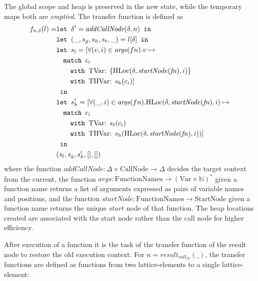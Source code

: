 The global scope and heap is preserved in the new state, while the temporary maps both are \emph{emptied}. The transfer function is defined as
\begin{align}
      f_{n,\delta}(l) =     &\texttt{let } \delta' = \mathit{addCallNode}(\delta, n) \texttt{ in }\notag\\
                            &\texttt{let } (\_, s_g, s_h,s_t, \_) = l[\delta] \texttt{ in }\notag\\
                            &\texttt{let } s_l = [\forall (v, i) \in \mathit{args}(fn). v \mapsto \notag\\
                            &\quad\texttt{match }c_i\notag\\
                            &\quad\quad\texttt{with }\text{TVar}\text{: } \{\text{HLoc}(\delta, \mathit{startNode}(\mathit{fn}), i)\}\notag\\
                            &\quad\quad\texttt{with }\text{THVar}\text{: } s_h(c_i)]\notag\\
                            & \texttt{ in }\notag\\
                            &\texttt{let } s_h' = [\forall (\_, i) \in \mathit{args}(fn). \text{HLoc}(\delta, \mathit{startNode}(\mathit{fn}), i) \mapsto \notag\\
                            &\quad\texttt{match }c_i\notag\\
                            &\quad\quad\texttt{with }\text{TVar}\text{: } s_t(c_i)\notag\\
                            &\quad\quad\texttt{with }\text{THVar}\text{: } s_h(\text{HLoc}(\delta, \mathit{startNode}(\mathit{fn}), i))]\notag\\
                            & \texttt{ in }\notag\\
                            &(s_l, s_g, s_h',[], [])
\end{align}
where the function $\mathit{addCallNode} : \Delta \times \text{CallNode} \rightarrow \Delta$ decides the target context from the current, the function $\mathit{args} : \text{FunctionNames} \rightarrow (\text{Var} \times \mathbb{N})^*$ given a function name returns a list of arguments expressed as pairs of variable names and positions, and the function $\mathit{startNode} : \text{FunctionNames} \rightarrow \text{StartNode}$ given a function name returns the unique $\mathit{start}$ node of that function. The heap locations created are associated with the start node rather than the call node for higher efficiency.

After execution of a function it is the task of the transfer function of the result node to restore the old execution context. For $n = \mathit{result}_{\mathit{call}_{fn}}(\_)$, the transfer functions are defined as functions from two lattice-elements to a single lattice-element:

